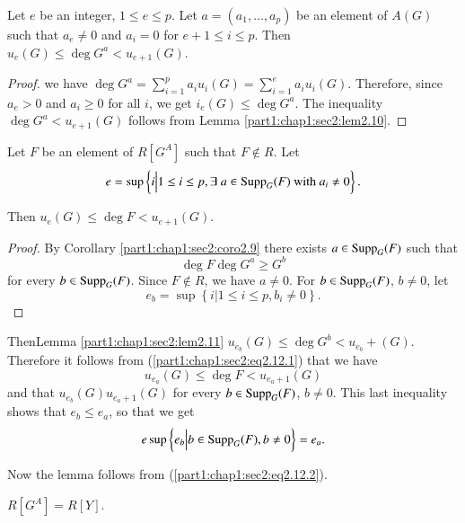 \begin{lemma} \label{part1:chap1:sec2:lem2.11}
  Let $e$ be an integer, $1 \leq e \leq p$. Let $a= (a_1 , \ldots , a_p)$ be an element of $A(G)$ such that $a_e \neq 0$ and $a_i =0$ for $e+1 \leq i \leq p$. Then $u_e (G) \leq \deg G^a< u_{e+1}(G)$.
\end{lemma}

\begin{proof}
  we have $\deg G^a= \sum^p _{i=1}a_i u_i (G)= \sum^e_{i=1} a_i u_i (G)$. Therefore, since $a_e > 0$ and $a_i \geq 0$ for all $i$, we get $i_e (G) \leq \deg G^a$. The inequality $\deg G^a < u_{e+1} (G)$ follows from Lemma \ref{part1:chap1:sec2:lem2.10}.
\end{proof}

\begin{lemma}\label{part1:chap1:sec2:lem2.12}
  Let $F$ be an element of $R[G^A]$ such that $F \notin R$. Let 
  $$
e= \sup \left\{ i \Big| 1 \leq i \leq p, \exists \; a \in \operatorname{Supp}_G (F) ~\text{with}~ a_i \neq 0\right\}.
$$
\end{lemma}

Then $u_e (G) \leq \deg F< u_{e+1} (G)$.

\begin{proof}
  By Corollary \ref{part1:chap1:sec2:coro2.9} there exists $a \in \operatorname{Supp}_G (F)$ such that
  \begin{equation*}
    \deg F \deg G^a \geq G^b \tag{2.12.1}\label{part1:chap1:sec2:eq2.12.1}
  \end{equation*}
  for every $b \in \operatorname{Supp}_G (F)$. Since $F \notin R$, we have $a \neq 0$. For $b \in \operatorname{Supp}_G (F)$, $b \neq 0$, let
$$
e_b = \sup \left\{ i \Big| 1 \leq i \leq p, b_i\neq 0\right\}.
$$
\end{proof}

Then\pageoriginale Lemma \ref{part1:chap1:sec2:lem2.11} 
$u_{e_b} (G) \leq \deg G^b < u_{e_b}+ (G)$. Therefore it follows from (\ref{part1:chap1:sec2:eq2.12.1}) that we have
\begin{equation*}
  u_{e_a} (G) \leq \deg F < u_{e_{a}+1} (G) \tag{2.12.2}\label{part1:chap1:sec2:eq2.12.2}
\end{equation*}
and that $u_{e_b} (G) u_{e_a+1}(G)$ for every $b \in \operatorname{Supp}_G (F)$, $b \neq 0$. This last inequality shows that $e_b \leq e_a$, so that we get
$$
e \sup \left\{ e_b \Big| b \in \operatorname{Supp}_G (F), b \neq 0 \right\} = e_a.
$$

Now the lemma follows from (\ref{part1:chap1:sec2:eq2.12.2}).

\begin{thm}\label{part1:chap1:sec2:thm2.13}
  $R[G^A]= R[Y]$.
\end{thm}

